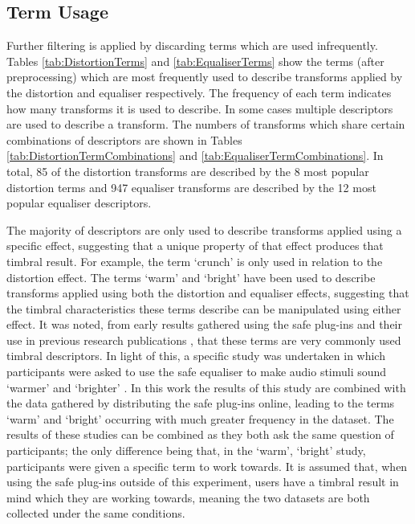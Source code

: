 	\subsection{Term Usage}
	\label{sec:TimbreEvaluation-Analysis-TermUsage}
		Further filtering is applied by discarding terms which are used infrequently. Tables
		\ref{tab:DistortionTerms} and \ref{tab:EqualiserTerms} show the terms (after preprocessing) which are most
		frequently used to describe transforms applied by the distortion and equaliser respectively. The frequency
		of each term indicates how many transforms it is used to describe. In some cases multiple descriptors are
		used to describe a transform. The numbers of transforms which share certain combinations of descriptors are
		shown in Tables \ref{tab:DistortionTermCombinations} and \ref{tab:EqualiserTermCombinations}. In total, 85
		of the distortion transforms are described by the 8 most popular distortion terms and 947 equaliser
		transforms are described by the 12 most popular equaliser descriptors.

		The majority of descriptors are only used to describe transforms applied using a specific effect,
		suggesting that a unique property of that effect produces that timbral result. For example, the term
		`crunch' is only used in relation to the distortion effect. The terms `warm' and `bright' have been used to
		describe transforms applied using both the distortion and equaliser effects, suggesting that the timbral
		characteristics these terms describe can be manipulated using either effect. It was noted, from early
		results gathered using the \acrshort{safe} plug-ins and their use in previous research publications
		\citep{geddes2003auditory, lukasik2005towards, zacharakis2011an}, that these terms are very commonly used
		timbral descriptors. In light of this, a specific study was undertaken in which participants were asked to
		use the \acrshort{safe} equaliser to make audio stimuli sound `warmer' and `brighter' \citep{stasis2015a}.
		In this work the results of this study are combined with the data gathered by distributing the
		\acrshort{safe} plug-ins online, leading to the terms `warm' and `bright' occurring with much greater
		frequency in the dataset. The results of these studies can be combined as they both ask the same question
		of participants; the only difference being that, in the `warm', `bright' study, participants were given a
		specific term to work towards. It is assumed that, when using the \acrshort{safe} plug-ins outside of this
		experiment, users have a timbral result in mind which they are working towards, meaning the two datasets
		are both collected under the same conditions.

